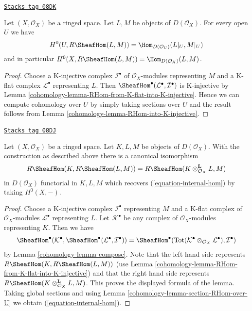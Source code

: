 \begin{lemma}
\label{cohomology-lemma-section-RHom-over-U}
\href{https://stacks.math.columbia.edu/tag/08DK}{\texttt{Stacks tag 08DK}}

Let $(X, \mathcal{O}_X)$ be a ringed space. Let $L, M$ be objects
of $D(\mathcal{O}_X)$. For every open $U$ we have
$$
H^0(U, R\SheafHom(L, M)) =
\Hom_{D(\mathcal{O}_U)}(L|_U, M|_U)
$$
and in particular $H^0(X, R\SheafHom(L, M)) = \Hom_{D(\mathcal{O}_X)}(L, M)$.
\end{lemma}

\begin{proof}

Choose a K-injective complex $\mathcal{I}^\bullet$ of
$\mathcal{O}_X$-modules representing $M$ and a K-flat complex
$\mathcal{L}^\bullet$ representing $L$. Then
$\SheafHom^\bullet(\mathcal{L}^\bullet, \mathcal{I}^\bullet)$
is K-injective by Lemma \ref{cohomology-lemma-RHom-from-K-flat-into-K-injective}.
Hence we can compute cohomology over $U$ by simply taking sections over $U$
and the result follows from Lemma \ref{cohomology-lemma-RHom-into-K-injective}.
\end{proof}

\begin{lemma}
\label{cohomology-lemma-internal-hom}
\href{https://stacks.math.columbia.edu/tag/08DJ}{\texttt{Stacks tag 08DJ}}

Let $(X, \mathcal{O}_X)$ be a ringed space. Let $K, L, M$ be objects
of $D(\mathcal{O}_X)$. With the construction as described above
there is a canonical isomorphism
$$
R\SheafHom(K, R\SheafHom(L, M)) =
R\SheafHom(K \otimes_{\mathcal{O}_X}^\mathbf{L} L, M)
$$
in $D(\mathcal{O}_X)$ functorial in $K, L, M$
which recovers (\ref{equation-internal-hom}) by taking $H^0(X, -)$.
\end{lemma}

\begin{proof}

Choose a K-injective complex $\mathcal{I}^\bullet$ representing
$M$ and a K-flat complex of $\mathcal{O}_X$-modules $\mathcal{L}^\bullet$
representing $L$. Let $\mathcal{K}^\bullet$ be any complex of
$\mathcal{O}_X$-modules representing $K$. Then
we have
$$
\SheafHom^\bullet(\mathcal{K}^\bullet,
\SheafHom^\bullet(\mathcal{L}^\bullet, \mathcal{I}^\bullet))
=
\SheafHom^\bullet(
\text{Tot}(\mathcal{K}^\bullet \otimes_{\mathcal{O}_X} \mathcal{L}^\bullet),
\mathcal{I}^\bullet)
$$
by Lemma \ref{cohomology-lemma-compose}.
Note that the left hand side represents
$R\SheafHom(K, R\SheafHom(L, M))$ (use
Lemma \ref{cohomology-lemma-RHom-from-K-flat-into-K-injective})
and that the right hand side represents
$R\SheafHom(K \otimes_{\mathcal{O}_X}^\mathbf{L} L, M)$.
This proves the displayed formula of the lemma.
Taking global sections and using Lemma \ref{cohomology-lemma-section-RHom-over-U}
we obtain (\ref{equation-internal-hom}).
\end{proof}

